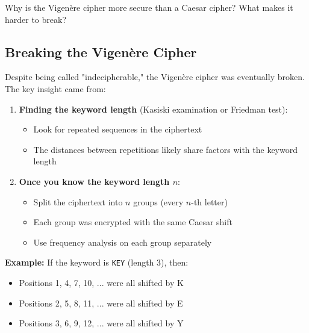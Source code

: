 \documentclass[11pt,a4paper]{report}
\begin{document}
\begin{ex}
Why is the Vigenère cipher more secure than a Caesar cipher? What makes it harder to break?
\end{ex}

\subsection{Breaking the Vigenère Cipher}

Despite being called "indecipherable," the Vigenère cipher was eventually broken. The key insight came from:

\begin{enumerate}
\item \textbf{Finding the keyword length} (Kasiski examination or Friedman test):
   \begin{itemize}
   \item Look for repeated sequences in the ciphertext
   \item The distances between repetitions likely share factors with the keyword length
   \end{itemize}

\item \textbf{Once you know the keyword length $n$}:
   \begin{itemize}
   \item Split the ciphertext into $n$ groups (every $n$-th letter)
   \item Each group was encrypted with the same Caesar shift
   \item Use frequency analysis on each group separately
   \end{itemize}
\end{enumerate}

\textbf{Example:} If the keyword is \verb|KEY| (length 3), then:
\begin{itemize}
\item Positions 1, 4, 7, 10, ... were all shifted by K
\item Positions 2, 5, 8, 11, ... were all shifted by E
\item Positions 3, 6, 9, 12, ... were all shifted by Y
\end{itemize}
\end{document}
